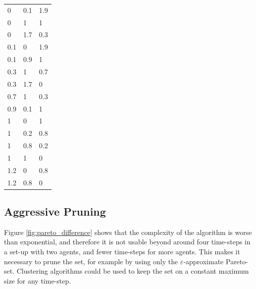 \documentclass{article}
\makeatletter
\newenvironment{tablehere}
{\def\@captype{table}}
{}
\makeatother
\begin{document}
\begin{multicols}{2}
	\vspace{0.5cm}
	\begin{tablehere}
		\centering
		\begin{tabular}{|lll|}
		\hline
		0		&	0.1	&	1.9\\
		0		&	1		&	1\\
		0		&	1.7	&	0.3\\
		\hline
		0.1	&	0		&	1.9\\
		0.1	&	0.9	&	1\\
		\hline
		0.3	&	1		&	0.7\\
		0.3	&	1.7	&	0\\
		\hline
		0.7	&	1		&	0.3\\
		\hline
		0.9	&	0.1	&	1\\
		\hline
		1		&	0		&	1\\
		1		&	0.2	&	0.8\\
		1		&	0.8	&	0.2\\
		1		&	1		&	0\\
		\hline
		1.2	&	0		&	0.8\\
		1.2	&	0.8	&	0\\
		\hline
		\end{tabular}
		\label{tab:t2_138}
	\end{tablehere}

	\subsection{Aggressive Pruning}
	\label{sub:aggressive_pruning} Figure \ref{fig:pareto_difference} shows that
	the complexity of the algorithm is worse than exponential, and therefore it
	is not usable beyond around four time-steps in a set-up with two agents, and
	fewer time-steps for more agents. This makes it necessary to prune the set,
	for example by using only the $\varepsilon$-approximate Pareto-set.
	Clustering algorithms could be used to keep the set on a constant maximum
	size for any time-step.
	\end{multicols}

	\clearpage
	
	
\end{document}
